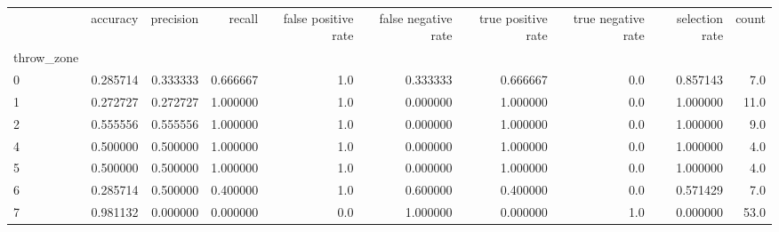 \begin{tabular}{lrrrrrrrrr}
\toprule
{} &  accuracy &  precision &    recall &  false positive rate &  false negative rate &  true positive rate &  true negative rate &  selection rate &  count \\
throw\_zone &           &            &           &                      &                      &                     &                     &                 &        \\
\midrule
0          &  0.285714 &   0.333333 &  0.666667 &                  1.0 &             0.333333 &            0.666667 &                 0.0 &        0.857143 &    7.0 \\
1          &  0.272727 &   0.272727 &  1.000000 &                  1.0 &             0.000000 &            1.000000 &                 0.0 &        1.000000 &   11.0 \\
2          &  0.555556 &   0.555556 &  1.000000 &                  1.0 &             0.000000 &            1.000000 &                 0.0 &        1.000000 &    9.0 \\
4          &  0.500000 &   0.500000 &  1.000000 &                  1.0 &             0.000000 &            1.000000 &                 0.0 &        1.000000 &    4.0 \\
5          &  0.500000 &   0.500000 &  1.000000 &                  1.0 &             0.000000 &            1.000000 &                 0.0 &        1.000000 &    4.0 \\
6          &  0.285714 &   0.500000 &  0.400000 &                  1.0 &             0.600000 &            0.400000 &                 0.0 &        0.571429 &    7.0 \\
7          &  0.981132 &   0.000000 &  0.000000 &                  0.0 &             1.000000 &            0.000000 &                 1.0 &        0.000000 &   53.0 \\
\bottomrule
\end{tabular}
